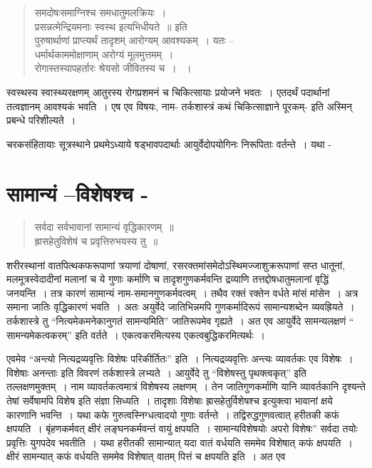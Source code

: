 {\begin{verse}
समदोषःसमाग्निश्च समधातुमलक्रियः~। \\
प्रसन्नत्मेन्द्रियमनाः स्वस्थ इत्यभिधीयते~॥ इति\\
पुरुषार्थाणां प्राप्त्यर्थं तादृशम् आरोग्यम् आवश्यकम्~। यतः –\\
धर्मार्थकाममोक्षाणाम् अरोग्यं मूलमुत्तमम्~। \\
रोगास्तस्यापहर्तारः श्रेयसो जीवितस्य च~। ~। 
\end{verse}
स्वस्थस्य स्वास्थ्यरक्षणम् आतुरस्य रोगप्रशमनं च चिकित्सायाः प्रयोजने भवतः~। एतदर्थं पदार्थानां तत्वज्ञानम् आवश्यकं भवति~। एष एव विषयः, नाम- तर्कशास्त्रं कथं चिकित्साज्ञाने पूरकम्- इति अस्मिन् प्रबन्धे परिशील्यते~। 

चरकसंहितायाः सूत्रस्थाने प्रथमेऽध्याये षड्भावपदार्थाः आयुर्वेदोपयोगिनः निरूपिताः वर्तन्ते~। यथा -

\section*{सामान्यं –विशेषश्च -}

\begin{verse}
सर्वदा सर्वभावानां सामान्यं वृद्धिकारणम्~॥\\
ह्रासहेतुविशेषं च प्रवृत्तिरुभयस्य तु~॥
\end{verse}

शरीरस्थानां वातपित्थकफरूपाणां त्रयाणां दोषाणां, रसरक्तमांसमेदोऽस्थिमज्जाशुक्ररूपाणां सप्त धातूनां, मलमूत्रस्वेदादीनां मलानां च ये गुणाः कर्माणि च तादृशगुणकर्मवन्ति द्रव्याणि तत्तद्दोषधातुमलानां वृद्धिं जनयन्ति~। तत्र कारणं सामान्यं नाम-समानगुणकर्मवत्वम्~। तथैव रक्तं रक्तेन वर्धते मांसं मांसेन~। अत्र समाना जातिः वृद्धिकारणं भवति~। अतः अयुर्वेदे जातिभिन्नमपि गुणकर्मादिरूपं सामान्यशब्देन व्यवह्रियते~। तर्कशास्त्रे तु “नित्यमेकमनेकानुगतं सामन्यमिति” जातिरूपमेव गृह्यते~। अत एव आयुर्वेदे सामन्यलक्षणं “ सामन्यमेकत्वकरम्” इति वर्तते~। एकत्वकरमित्यस्य एकत्वबुद्धिकरमित्यर्थः~। 

एवमेव “अन्त्यो नित्यद्रव्यवृत्तिः विशेषः परिकीर्तितः” इति~। नित्यद्रव्यवृत्तिः अन्त्यः व्यावर्तकः एव विशेषः~। विशेषाः अनन्ताः इति विवरणं तर्कशास्त्रे लभ्यते~। आयुर्वेदे तु “विशेषस्तु पृथक्त्वकृत्” इति तल्लक्षणमुक्तम्~। नाम व्यावर्तकत्वमात्रं विशेषस्य लक्षणम्~। तेन जातिगुणकर्माणि यानि व्यावर्तकानि दृश्यन्ते तेषां सर्वेषामपि विशेष इति संज्ञा सिध्यति~। तादृशाः विशेषाः ह्रासहेतुर्विशेषश्च इत्युक्त्वा भावानां क्षये कारणानि भवन्ति~। यथा कफे गुरुत्वस्निग्धत्वादयो गुणाः वर्तन्ते~। तद्विरुद्धगुणवत्वात् हरीतकी कफं क्षपयति~। बृंहणकर्मवत् क्षीरं लङ्घनकर्मवन्तं वायुं क्षपयति~। सामान्यविशेषयोः अपरो विशेषः” सर्वदा तयोः प्रवृत्तिः युगपदेव भवतीति~। यथा हरीतकी सामान्यात् यदा वातं वर्धयति सममेव विशेषात् कफं क्षपयति~। क्षीरं सामन्यात् कफं वर्धयति सममेव विशेषात् वातम् पित्तं च क्षपयति इति~। अत एव

}

